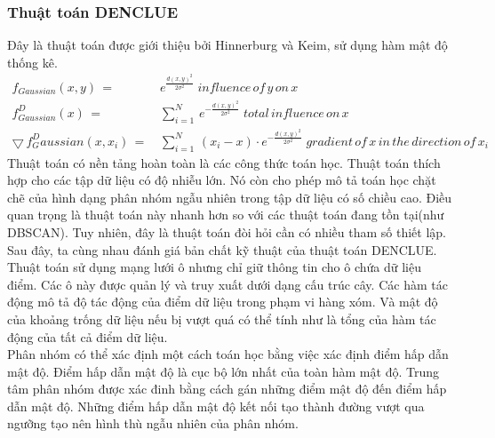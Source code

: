 \subsubsection{Thuật toán DENCLUE}
\hspace{10mm}Đây là thuật toán được giới thiệu bởi Hinnerburg và Keim, sử dụng hàm mật độ thống kê.\\
\begin{align*}
f_{Gaussian}(x,y) \, =& \, e^{\frac{d(x,y)^2}{2{\sigma}^2}} \; influence\, of\, y\, on\, x\\
f^D_{Gaussian}(x) \, =& \, \sum_{i=1}^N \, e^{-\frac{d(x,y)^2}{2{\sigma}^2}} \; total\, influence\, on\, x \\
\bigtriangledown \, f^D_Gaussian(x, x_i) \, =& \, \sum_{i=1}^N \, (x_i - x) \cdot e^{-\frac{d(x,y)^2}{2{\sigma}^2}} \; gradient\, of\, x\, in\, the\, direction\, of\, x_i
\end{align*}
\hspace{10mm}Thuật toán có nền tảng hoàn toàn là các công thức toán học. Thuật toán thích hợp cho các tập dữ liệu có độ nhiễu lớn. Nó còn cho phép mô tả toán học chặt chẽ của hình dạng phân nhóm ngẫu nhiên trong tập dữ liệu có số chiều cao. Điều quan trọng là thuật toán này nhanh hơn so với các thuật toán đang tồn tại(như DBSCAN). Tuy nhiên, đây là thuật toán đòi hỏi cần có nhiều tham số thiết lập.\\
\hspace*{10mm}Sau đây, ta cùng nhau đánh giá bản chất kỹ thuật của thuật toán DENCLUE. Thuật toán sử dụng mạng lưới ô nhưng chỉ giữ thông tin cho ô chứa dữ liệu điểm. Các ô này được quản lý và truy xuất dưới dạng cấu trúc cây. Các hàm tác động mô tả độ tác động của điểm dữ liệu trong phạm vi hàng xóm. Và mật độ của khoảng trống dữ liệu nếu bị vượt quá có thể tính như là tổng của hàm tác động của tất cả điểm dữ liệu.\\
\hspace*{10mm}Phân nhóm có thể xác định một cách toán học bằng việc xác định điểm hấp dẫn mật độ. Điểm hấp dẫn mật độ là cục bộ lớn nhất của toàn hàm mật độ. Trung tâm phân nhóm được xác đinh bằng cách gán những điểm mật độ đến điểm hấp dẫn mật độ. Những điểm hấp dẫn mật độ kết nối tạo thành đường vượt qua ngưỡng tạo nên hình thù ngẫu nhiên của phân nhóm.\\



